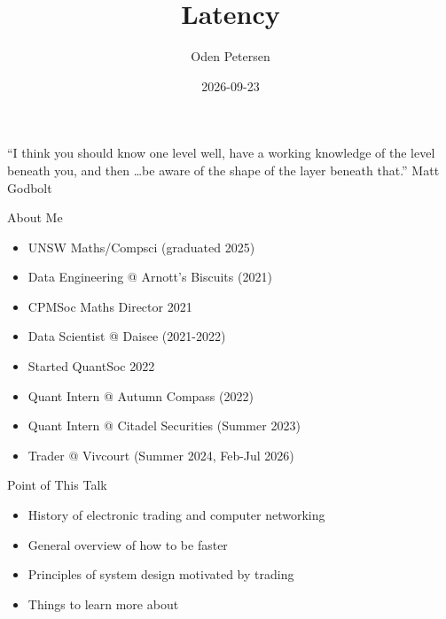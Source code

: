 \documentclass{beamer}
\title[\texttt{/trading-presentation}]{Latency}
\author[\texttt{github.com/odenpetersen}]{Oden Petersen}
\date{2026-09-23}
\begin{document}
\begin{frame}
	\titlepage

	``I think you should know one level well, have a working knowledge of the level beneath you, and then \ldots be aware of the shape of the layer beneath that.'' Matt Godbolt
\end{frame}

\begin{frame}{About Me}
	\begin{itemize}
		\item UNSW Maths/Compsci (graduated 2025)
		\item Data Engineering @ Arnott's Biscuits (2021)
		\item CPMSoc Maths Director 2021
		\item Data Scientist @ Daisee (2021-2022)
		\item Started QuantSoc 2022
		\item Quant Intern @ Autumn Compass (2022)
		\item Quant Intern @ Citadel Securities (Summer 2023)
		\item Trader @ Vivcourt (Summer 2024, Feb-Jul 2026)
	\end{itemize}
\end{frame}

\begin{frame}{Point of This Talk}
	\begin{itemize}
		\item History of electronic trading and computer networking
		\item General overview of how to be faster
		\item Principles of system design motivated by trading
		\item Things to learn more about%
	\end{itemize}
\end{frame}
\end{document}
